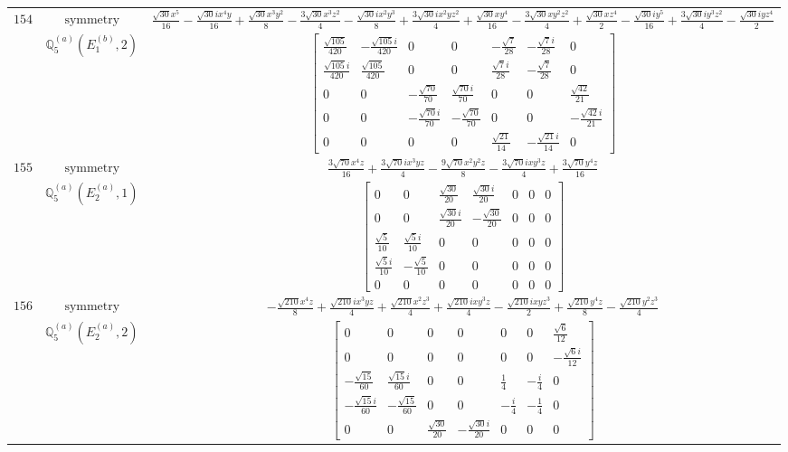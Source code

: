 \documentclass[fleqn,8pt,landscape]{jsarticle}
\begin{document}
\begin{longtable}{ccc}
$ 154 $ & $ \text{symmetry} $ & $ \frac{\sqrt{30} x^{5}}{16} - \frac{\sqrt{30} i x^{4} y}{16} + \frac{\sqrt{30} x^{3} y^{2}}{8} - \frac{3 \sqrt{30} x^{3} z^{2}}{4} - \frac{\sqrt{30} i x^{2} y^{3}}{8} + \frac{3 \sqrt{30} i x^{2} y z^{2}}{4} + \frac{\sqrt{30} x y^{4}}{16} - \frac{3 \sqrt{30} x y^{2} z^{2}}{4} + \frac{\sqrt{30} x z^{4}}{2} - \frac{\sqrt{30} i y^{5}}{16} + \frac{3 \sqrt{30} i y^{3} z^{2}}{4} - \frac{\sqrt{30} i y z^{4}}{2} $ \\
$  $ & $ \mathbb{Q}_{5}^{(a)}(E_{1}^{(b)},2) $ & $ \begin{bmatrix} \frac{\sqrt{105}}{420} & - \frac{\sqrt{105} i}{420} & 0 & 0 & - \frac{\sqrt{7}}{28} & - \frac{\sqrt{7} i}{28} & 0 \\ \frac{\sqrt{105} i}{420} & \frac{\sqrt{105}}{420} & 0 & 0 & \frac{\sqrt{7} i}{28} & - \frac{\sqrt{7}}{28} & 0 \\ 0 & 0 & - \frac{\sqrt{70}}{70} & \frac{\sqrt{70} i}{70} & 0 & 0 & \frac{\sqrt{42}}{21} \\ 0 & 0 & - \frac{\sqrt{70} i}{70} & - \frac{\sqrt{70}}{70} & 0 & 0 & - \frac{\sqrt{42} i}{21} \\ 0 & 0 & 0 & 0 & \frac{\sqrt{21}}{14} & - \frac{\sqrt{21} i}{14} & 0 \end{bmatrix} $ \\ \hline
$ 155 $ & $ \text{symmetry} $ & $ \frac{3 \sqrt{70} x^{4} z}{16} + \frac{3 \sqrt{70} i x^{3} y z}{4} - \frac{9 \sqrt{70} x^{2} y^{2} z}{8} - \frac{3 \sqrt{70} i x y^{3} z}{4} + \frac{3 \sqrt{70} y^{4} z}{16} $ \\
$  $ & $ \mathbb{Q}_{5}^{(a)}(E_{2}^{(a)},1) $ & $ \begin{bmatrix} 0 & 0 & \frac{\sqrt{30}}{20} & \frac{\sqrt{30} i}{20} & 0 & 0 & 0 \\ 0 & 0 & \frac{\sqrt{30} i}{20} & - \frac{\sqrt{30}}{20} & 0 & 0 & 0 \\ \frac{\sqrt{5}}{10} & \frac{\sqrt{5} i}{10} & 0 & 0 & 0 & 0 & 0 \\ \frac{\sqrt{5} i}{10} & - \frac{\sqrt{5}}{10} & 0 & 0 & 0 & 0 & 0 \\ 0 & 0 & 0 & 0 & 0 & 0 & 0 \end{bmatrix} $ \\ \hline
$ 156 $ & $ \text{symmetry} $ & $ - \frac{\sqrt{210} x^{4} z}{8} + \frac{\sqrt{210} i x^{3} y z}{4} + \frac{\sqrt{210} x^{2} z^{3}}{4} + \frac{\sqrt{210} i x y^{3} z}{4} - \frac{\sqrt{210} i x y z^{3}}{2} + \frac{\sqrt{210} y^{4} z}{8} - \frac{\sqrt{210} y^{2} z^{3}}{4} $ \\
$  $ & $ \mathbb{Q}_{5}^{(a)}(E_{2}^{(a)},2) $ & $ \begin{bmatrix} 0 & 0 & 0 & 0 & 0 & 0 & \frac{\sqrt{6}}{12} \\ 0 & 0 & 0 & 0 & 0 & 0 & - \frac{\sqrt{6} i}{12} \\ - \frac{\sqrt{15}}{60} & \frac{\sqrt{15} i}{60} & 0 & 0 & \frac{1}{4} & - \frac{i}{4} & 0 \\ - \frac{\sqrt{15} i}{60} & - \frac{\sqrt{15}}{60} & 0 & 0 & - \frac{i}{4} & - \frac{1}{4} & 0 \\ 0 & 0 & \frac{\sqrt{30}}{20} & - \frac{\sqrt{30} i}{20} & 0 & 0 & 0 \end{bmatrix} $ \\ \hline

\end{longtable}
\end{document}
